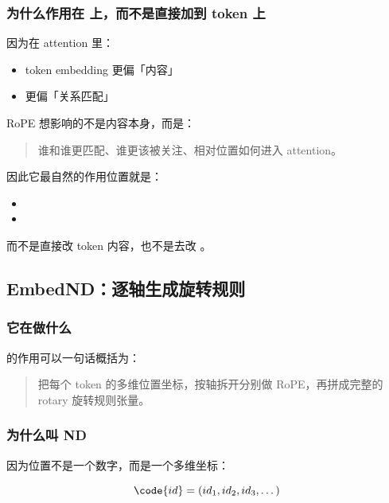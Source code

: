 \subsubsection{为什么作用在  上，而不是直接加到 token 上}

因为在 attention 里：

\begin{itemize}[leftmargin=1.5em]
  \item token embedding 更偏「内容」
  \item {} 更偏「关系匹配」
\end{itemize}

RoPE 想影响的不是内容本身，而是：

\begin{quote}
谁和谁更匹配、谁更该被关注、相对位置如何进入 attention。
\end{quote}

因此它最自然的作用位置就是：

\begin{itemize}[leftmargin=1.5em]
  \item {}
  \item {}
\end{itemize}

而不是直接改 token 内容，也不是去改 。

\subsection{EmbedND：逐轴生成旋转规则}

\subsubsection{它在做什么}

 的作用可以一句话概括为：

\begin{quote}
把每个 token 的多维位置坐标，按轴拆开分别做 RoPE，再拼成完整的 rotary 旋转规则张量。
\end{quote}

\subsubsection{为什么叫 ND}

因为位置不是一个数字，而是一个多维坐标：

\[
\code{id} = (id_1, id_2, id_3, \dots)
\]

